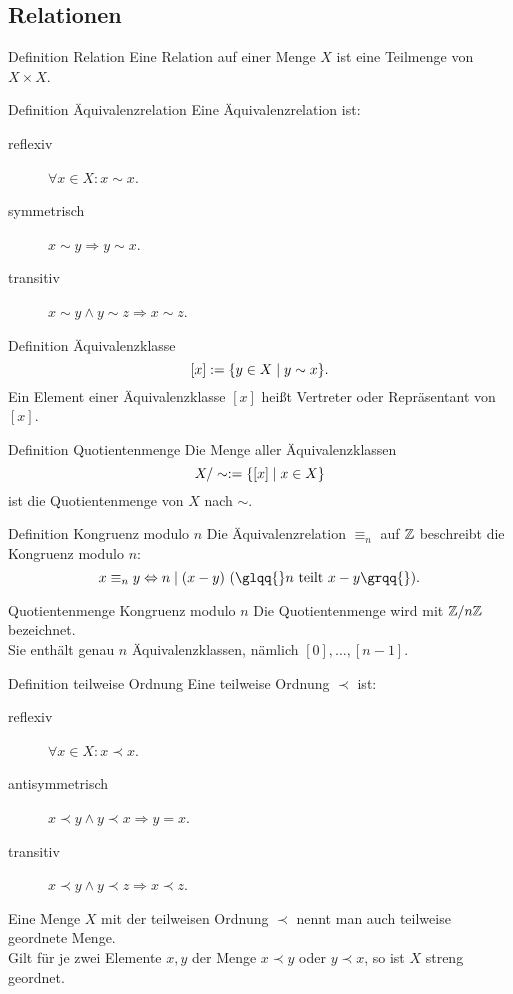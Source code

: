 \documentclass[main.tex]{subfiles}
\begin{document}
\subsection*{Relationen}
\begin{karte}{Definition Relation}
    Eine Relation auf einer Menge \(X\)  ist eine Teilmenge 
    von \( X \times X \).
\end{karte}
\begin{karte}{Definition Äquivalenzrelation}
    Eine Äquivalenzrelation ist:
    \begin{description}
        \item[reflexiv] \( \forall x \in X : x \sim x \).
        \item[symmetrisch] \( x \sim y \Rightarrow y \sim x \).
        \item[transitiv] \( x \sim y \wedge y \sim z \Rightarrow 
        x \sim z \).
    \end{description}
\end{karte}
\begin{karte}{Definition Äquivalenzklasse}
    \[ [ x ] := \{ y \in X \;\vert \; y \sim x \}. \]
    Ein Element einer Äquivalenzklasse \( [x] \) heißt 
    Vertreter oder Repräsentant von \( [x] \).
\end{karte}
\begin{karte}{Definition Quotientenmenge}
    Die Menge aller Äquivalenzklassen 
    \[ X / \sim := \{ [x] \;\vert \; x \in X \} \]
    ist die Quotientenmenge von \( X \) nach \( \sim \).
\end{karte}
\begin{karte}{Definition Kongruenz modulo \(n\)}
    Die Äquivalenzrelation \( \equiv_n \) auf \( \mathbb{Z} \) beschreibt die 
    Kongruenz modulo \(n\):
    \[ x \equiv_n y \Leftrightarrow n \;\vert \; (x-y) 
    \ (\text{\glqq{}} n \text{ teilt } x-y \text{\grqq{}}). \] 
\end{karte}
\begin{karte}{Quotientenmenge Kongruenz modulo \(n\)}
    Die Quotientenmenge wird mit \( \mathbb{Z} / n\mathbb{Z} \) bezeichnet. \\
    Sie enthält genau \(n\) Äquivalenzklassen, nämlich 
    \( [0], \ldots, [n-1] \).
\end{karte}
\begin{karte}{Definition teilweise Ordnung}
    Eine teilweise Ordnung \( \prec \) ist:
    \begin{description}
        \item[reflexiv] \( \forall x \in X : x \prec x \).
        \item[antisymmetrisch] \( x \prec y \wedge y \prec x 
        \Rightarrow y = x \).
        \item[transitiv] \( x \prec y \wedge y \prec z \Rightarrow 
        x \prec z \).
    \end{description}
    Eine Menge \(X\) mit der teilweisen Ordnung \( \prec \) nennt 
    man auch teilweise geordnete Menge.\\
    Gilt für je zwei Elemente \( x,y \) der Menge \( x \prec y \) 
    oder \( y \prec x \), so ist \(X\) streng geordnet.
\end{karte}
\end{document}
